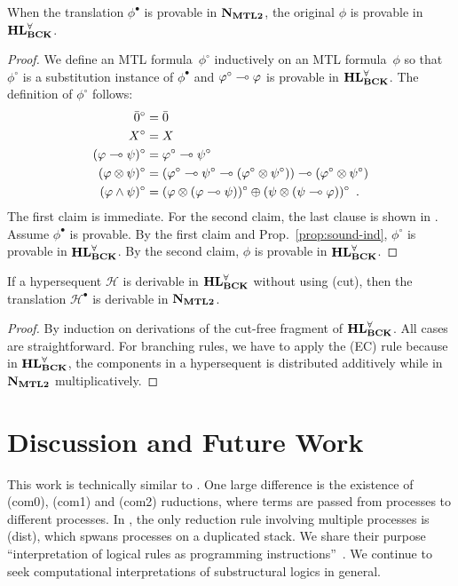 \documentclass[envcountsame]{llncs}
\begin{document}
 \begin{proposition}[Soundness]
  \label{prop:sound}
  When the translation $\phi^\bullet$ is provable in $\mathbf{N}_{\mathbf{MTL2}}$, the
  original $\phi$ is provable in $\mathbf{HL}^\forall_{\mathbf{BCK}}$.
 \end{proposition}
  \begin{proof}
   We define an MTL formula~$\phi^\circ$ inductively on an MTL
   formula~$\phi$ so that $\phi^\circ$ is a substitution instance of
   $\phi^\bullet$ and $\varphi^\circ\multimap\varphi$ is provable in
   $\mathbf{HL}^\forall_{\mathbf{BCK}}$.
   The definition of $\phi^\circ$ follows:
   \begin{align*}
    \bar 0^\circ&= \bar 0\\
    X^\circ &=X \\
    (\varphi\multimap\psi)^\circ&=\varphi^\circ\multimap\psi^\circ\\
    (\varphi\otimes\psi)^\circ &=
    (\varphi^\circ\multimap\psi^\circ\multimap(\varphi^\circ\otimes\psi^\circ))\multimap(\varphi^\circ\otimes\psi^\circ)\\
    (\varphi\land\psi)^\circ &=
    (\varphi\otimes(\varphi\multimap\psi))^\circ \oplus
    (\psi\otimes(\psi\multimap\varphi))^\circ\enspace.
   \end{align*}
   The first claim is immediate.  For the second claim, the last clause
   is shown in \citep[Lem.~6.5]{Cintula200740}.  Assume $\phi^\bullet$
   is provable.  By the first claim and Prop.~\ref{prop:sound-ind},
   $\phi^\circ$ is provable in $\mathbf{HL}^\forall_{\mathbf{BCK}}$.  By the second claim, $\phi$ is
   provable in $\mathbf{HL}^\forall_{\mathbf{BCK}}$.
  \end{proof}

\begin{proposition}[Completeness]
 \label{prop:comp}
 If a hypersequent $\mathcal H$ is
 derivable in $\mathbf{HL}^\forall_{\mathbf{BCK}}$ without using (cut), then the translation $\mathcal H^\bullet$ is
 derivable in $\mathbf{N}_{\mathbf{MTL2}}$.
\end{proposition}
\begin{proof}
 By induction on derivations of the cut-free fragment of $\mathbf{HL}^\forall_{\mathbf{BCK}}$.
 All cases are straightforward.  For branching rules, we have to apply
 the (EC) rule because in $\mathbf{HL}^\forall_{\mathbf{BCK}}$, the components in a hypersequent is distributed
 additively while in $\mathbf{N}_{\mathbf{MTL2}}$ multiplicatively.
\end{proof}

\section{Discussion and Future Work}
\label{sec:discuss}
This work is technically similar to \citet{danos-krivine}.
One large difference is the existence of (com0), (com1) and (com2)
ruductions, where terms are passed from processes to different
processes.
In \citet{danos-krivine}, the only reduction rule involving multiple
processes is (dist), which spwans processes on a duplicated stack.
We share their purpose
``interpretation of logical rules as programming
instructions''~\citep{danos-krivine}.
We continue to seek computational interpretations of substructural
logics in general.
\end{document}
